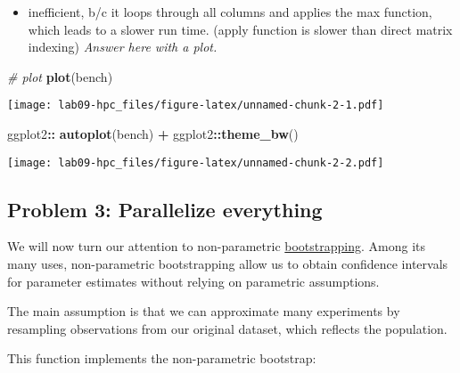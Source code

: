 \documentclass[
]{article}
\newenvironment{Shaded}{\begin{snugshade}}{\end{snugshade}}
\newcommand{\CommentTok}[1]{\textcolor[rgb]{0.56,0.35,0.01}{\textit{#1}}}
\newcommand{\FunctionTok}[1]{\textcolor[rgb]{0.13,0.29,0.53}{\textbf{#1}}}
\newcommand{\NormalTok}[1]{#1}
\newcommand{\SpecialCharTok}[1]{\textcolor[rgb]{0.81,0.36,0.00}{\textbf{#1}}}
\providecommand{\tightlist}{%
  \setlength{\itemsep}{0pt}\setlength{\parskip}{0pt}}
\begin{document}
\begin{itemize}
\tightlist
\item
  inefficient, b/c it loops through all columns and applies the max
  function, which leads to a slower run time. (apply function is slower
  than direct matrix indexing) \emph{Answer here with a plot.}
\end{itemize}

\begin{Shaded}
\begin{Highlighting}[]
\CommentTok{\# plot }
\FunctionTok{plot}\NormalTok{(bench)}
\end{Highlighting}
\end{Shaded}

\texttt{[image: lab09-hpc\_files/figure-latex/unnamed-chunk-2-1.pdf]}

\begin{Shaded}
\begin{Highlighting}[]
\NormalTok{ggplot2}\SpecialCharTok{::} \FunctionTok{autoplot}\NormalTok{(bench) }\SpecialCharTok{+} 
\NormalTok{  ggplot2}\SpecialCharTok{::}\FunctionTok{theme\_bw}\NormalTok{()}
\end{Highlighting}
\end{Shaded}

\texttt{[image: lab09-hpc\_files/figure-latex/unnamed-chunk-2-2.pdf]}

\subsection{Problem 3: Parallelize
everything}\label{problem-3-parallelize-everything}

We will now turn our attention to non-parametric
\href{https://en.wikipedia.org/wiki/Bootstrapping_(statistics)}{bootstrapping}.
Among its many uses, non-parametric bootstrapping allow us to obtain
confidence intervals for parameter estimates without relying on
parametric assumptions.

The main assumption is that we can approximate many experiments by
resampling observations from our original dataset, which reflects the
population.

This function implements the non-parametric bootstrap:
\end{document}
